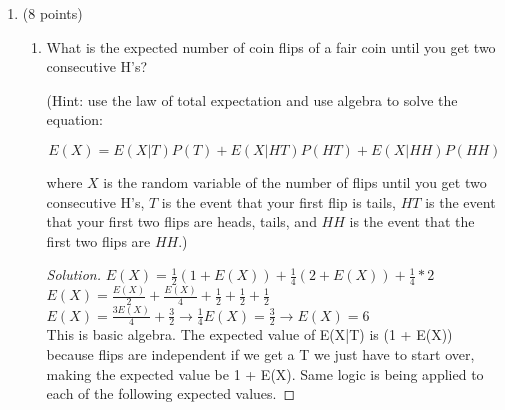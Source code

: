 \documentclass[10pt,letterpaper,unboxed,cm]{article}
\newenvironment{solution}
  {\begin{proof}[Solution]}
  {\end{proof}}
\begin{document}
\begin{enumerate}
\begin{enumerate}
\begin{enumerate}
\item
Compute the expected number of rooms with exactly 1 print.

\begin{solution}
    
    Let $X_i$ be 1 if room has exactly one print, 0 otherwise.\\
    \(P(X_i) = \frac{\binom{18}{10}}{\binom{20}{11}}\)\\
    This is true because we take away one print and one room, and run the stars and bars formula and divide by the total amount of ways.\\
    Now by linearity of expectaction we can find the expected number of rooms with exactly 1 print:\\
    \(E(X) = 12 * \frac{\binom{18}{10}}{\binom{20}{11}} \approx \boxed{3.13 \text{ rooms}}\)

\end{solution}

\end{enumerate}

\end{enumerate}


\item (8 points)

\begin{enumerate}
\item
What is the expected number of coin flips of a fair coin until you get two consecutive H's?

(Hint: use the law of total expectation and use algebra to solve the equation:

$$E(X) = E(X|T)P(T) + E(X|HT)P(HT) + E(X|HH)P(HH)$$

where $X$ is the random variable of the number of flips until you get two consecutive H's, $T$ is the event that your first flip is tails, $HT$ is the event that your first two flips are heads, tails, and $HH$ is the event that the first two flips are $HH$.)

\begin{solution}

    \(E(X) = \frac{1}{2}(1 + E(X))  +  \frac{1}{4}(2 + E(X)) + \frac{1}{4}*2\)\\
    \(E(X) = \frac{E(X)}{2} + \frac{E(X)}{4} + \frac{1}{2} + \frac{1}{2} + \frac{1}{2}\)\\
    \(E(X) = \frac{3E(X)}{4} + \frac{3}{2} \rightarrow \frac{1}{4}E(X) = \frac{3}{2} \rightarrow \boxed{E(X) = 6}\)\\
    This is basic algebra. The expected value of E(X|T) is (1 + E(X)) because flips are independent if we get a T we just have to start over, making the expected value be 1 + E(X).
    Same logic is being applied to each of the following expected values.


\end{solution}
\end{enumerate}
\end{enumerate}
\end{document}
